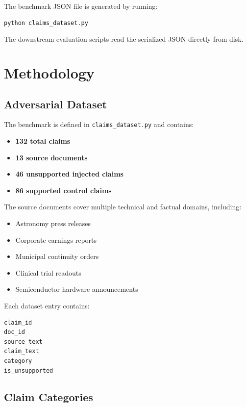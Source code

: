 \documentclass[11pt,a4paper]{article}
\begin{document}
The benchmark JSON file is generated by running:

\begin{lstlisting}[language=bash]
python claims_dataset.py
\end{lstlisting}

The downstream evaluation scripts read the serialized JSON directly from disk.


\section{Methodology}

\subsection{Adversarial Dataset}

The benchmark is defined in \texttt{claims\_dataset.py} and contains:

\begin{itemize}
    \item \textbf{132 total claims}
    \item \textbf{13 source documents}
    \item \textbf{46 unsupported injected claims}
    \item \textbf{86 supported control claims}
\end{itemize}

The source documents cover multiple technical and factual domains, including:

\begin{itemize}
    \item Astronomy press releases
    \item Corporate earnings reports
    \item Municipal continuity orders
    \item Clinical trial readouts
    \item Semiconductor hardware announcements
\end{itemize}

Each dataset entry contains:

\begin{lstlisting}
claim_id
doc_id
source_text
claim_text
category
is_unsupported
\end{lstlisting}

\subsection{Claim Categories}
\end{document}
